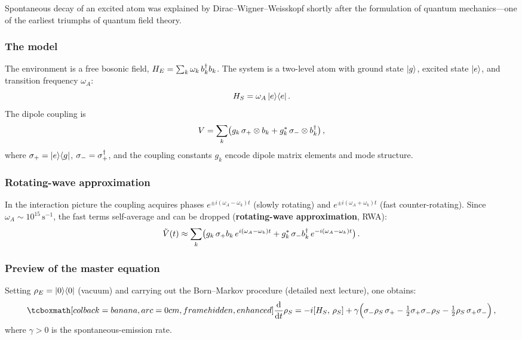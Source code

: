\begin{historical}
  Spontaneous decay of an excited atom was explained by
  Dirac--Wigner--Weisskopf shortly after the formulation of quantum
  mechanics---one of the earliest triumphs of quantum field theory.
\end{historical}

\subsubsection{The model}

The environment is a free bosonic field,
$H_E = \sum_k \omega_k\, b_k^\dagger b_k$.
The system is a two-level atom with ground state $\lvert g \rangle$, excited
state $\lvert e \rangle$, and transition frequency $\omega_A$:
\begin{equation}\label{eq:H-atom}
  H_S = \omega_A\,\lvert e \rangle\langle e \rvert\,.
\end{equation}
The dipole coupling is
\begin{equation}\label{eq:V-dipole}
  V = \sum_k \bigl(g_k\,\sigma_+\otimes b_k
      + g_k^*\,\sigma_-\otimes b_k^\dagger\bigr)\,,
\end{equation}
where $\sigma_+=\lvert e \rangle\langle g \rvert$, $\sigma_-=\sigma_+^\dagger$, and the
coupling constants $g_k$ encode dipole matrix elements and mode
structure.

\subsubsection{Rotating-wave approximation}

In the interaction picture the coupling acquires phases
$e^{\pm i(\omega_A-\omega_k)t}$ (slowly rotating) and
$e^{\pm i(\omega_A+\omega_k)t}$ (fast counter-rotating).  Since
$\omega_A\sim 10^{15}\,\mathrm{s}^{-1}$, the fast terms
self-average and can be dropped (\textbf{rotating-wave
approximation}, RWA):
\begin{equation}\label{eq:V-int-atom}
  \tilde{V}(t)
  \approx \sum_k \bigl(
    g_k\,\sigma_+ b_k\, e^{i(\omega_A-\omega_k)t}
  + g_k^*\,\sigma_- b_k^\dagger\, e^{-i(\omega_A-\omega_k)t}\bigr)\,.
\end{equation}

\subsubsection{Preview of the master equation}

Setting $\rho_E=\lvert 0 \rangle\langle 0 \rvert$ (vacuum) and carrying out the
Born--Markov procedure (detailed next lecture), one obtains:
\begin{equation}\label{eq:lindblad-atom-preview}
  \eqbox{
  \frac{\dd}{\dd t}\rho_S
  = -i[H_S,\,\rho_S]
  + \gamma\Bigl(
      \sigma_-\rho_S\,\sigma_+
    - \tfrac{1}{2}\sigma_+\sigma_-\rho_S
    - \tfrac{1}{2}\rho_S\,\sigma_+\sigma_-\Bigr)}\,,
\end{equation}
where $\gamma>0$ is the spontaneous-emission rate.

